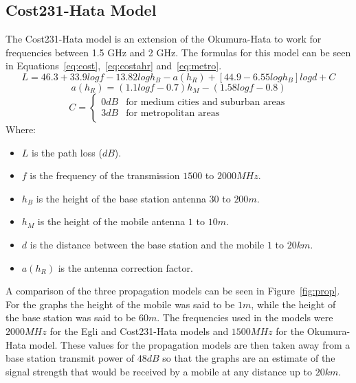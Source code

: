 \subsection{Cost231-Hata Model}
The Cost231-Hata model is an extension of the Okumura-Hata to work for frequencies between 1.5 GHz and 2 GHz. The formulas for this model can be seen in Equations~\ref{eq:cost},~\ref{eq:costahr} and~\ref{eq:metro}.
\begin{equation}\label{eq:cost}
L=46.3+33.9logf-13.82log{h_{B}}-a(h_{R})+[44.9-6.55log{h_{B}}]log{d}+C
\end{equation}
\begin{equation}\label{eq:costahr}
a(h_{R})=(1.1log{f}-0.7)h_{M}-(1.58log{f}-0.8)
\end{equation}
\begin{equation}\label{eq:metro}
C=
	\begin{cases}
	0 dB & \mbox{for medium cities and suburban areas} \\
	3 dB & \mbox{for metropolitan areas}
	\end{cases}
\end{equation}
Where:
\begin{itemize}
\item $L$ is the path loss ($dB$).
\item $f$ is the frequency of the transmission $1500$ to $2000 MHz$.
\item $h_{B}$ is the height of the base station antenna $30$ to $200 m$.
\item $h_{M}$ is the height of the mobile antenna $1$ to $10 m$.
\item $d$ is the distance between the base station and the mobile $1$ to $20 km$.
\item $a(h_{R})$ is the antenna correction factor.
\end{itemize}
A comparison of the three propagation models can be seen in Figure~\ref{fig:prop}. For the graphs the height of the mobile was said to be $1 m$, while the height of the base station was said to be $60 m$. The frequencies used in the models were $2000 MHz$ for the Egli and Cost231-Hata models and $1500 MHz$ for the Okumura-Hata model. These values for the propagation models are then taken away from a base station transmit power of $48 dB$ so that the graphs are an estimate of the signal strength that would be received by a mobile at any distance up to $20 km$.
